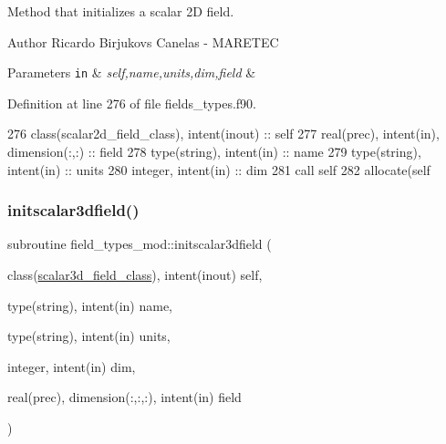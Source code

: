 Method that initializes a scalar 2D field. 

\begin{DoxyAuthor}{Author}
Ricardo Birjukovs Canelas -\/ M\+A\+R\+E\+T\+EC 
\end{DoxyAuthor}

\begin{DoxyParams}[1]{Parameters}
\mbox{\tt in}  & {\em self,name,units,dim,field} & \\
\hline
\end{DoxyParams}


Definition at line 276 of file fields\+\_\+types.\+f90.


\begin{DoxyCode}
276     \textcolor{keywordtype}{class}(scalar2d\_field\_class), \textcolor{keywordtype}{intent(inout)} :: self
277     \textcolor{keywordtype}{real(prec)}, \textcolor{keywordtype}{intent(in)}, \textcolor{keywordtype}{dimension(:,:)} :: field
278     \textcolor{keywordtype}{type}(string), \textcolor{keywordtype}{intent(in)} :: name
279     \textcolor{keywordtype}{type}(string), \textcolor{keywordtype}{intent(in)} :: units
280     \textcolor{keywordtype}{integer}, \textcolor{keywordtype}{intent(in)} :: dim
281     \textcolor{keyword}{call }self%
282     \textcolor{keyword}{allocate}(self%
\end{DoxyCode}
\mbox{\label{namespacefield__types__mod_af27a754aea73132de47e0a1b7168ca2e}} 
\subsubsection{\texorpdfstring{initscalar3dfield()}{initscalar3dfield()}}
{\footnotesize\ttfamily subroutine field\+\_\+types\+\_\+mod\+::initscalar3dfield (\begin{DoxyParamCaption}\item[{class(\mbox{\hyperlink{structfield__types__mod_1_1scalar3d__field__class}{scalar3d\+\_\+field\+\_\+class}}), intent(inout)}]{self,  }\item[{type(string), intent(in)}]{name,  }\item[{type(string), intent(in)}]{units,  }\item[{integer, intent(in)}]{dim,  }\item[{real(prec), dimension(\+:,\+:,\+:), intent(in)}]{field }\end{DoxyParamCaption})\hspace{0.3cm}{\ttfamily [private]}}



